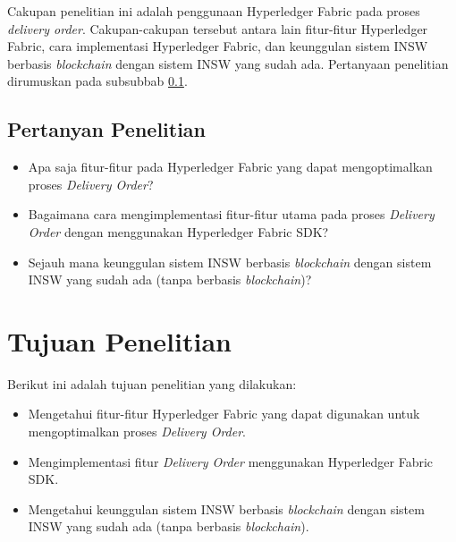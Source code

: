 Cakupan penelitian ini adalah penggunaan Hyperledger Fabric pada proses \textit{delivery order}. Cakupan-cakupan tersebut antara lain fitur-fitur Hyperledger Fabric, cara implementasi Hyperledger Fabric, dan keunggulan sistem INSW berbasis \textit{blockchain} dengan sistem INSW yang sudah ada. Pertanyaan penelitian dirumuskan pada subsubbab \ref{sec:pertanyaanPenelitian}.

\subsection{Pertanyan Penelitian}
\label{sec:pertanyaanPenelitian}

\begin{itemize}
	\item Apa saja fitur-fitur pada Hyperledger Fabric yang dapat mengoptimalkan proses \textit{Delivery Order}?
	\item Bagaimana cara mengimplementasi fitur-fitur utama pada proses \textit{Delivery Order} dengan menggunakan Hyperledger Fabric SDK?
	\item Sejauh mana keunggulan sistem INSW berbasis \textit{blockchain} dengan sistem INSW yang sudah ada (tanpa berbasis \textit{blockchain})?
\end{itemize}

\section{Tujuan Penelitian}
\label{sec:tujuan}
Berikut ini adalah tujuan penelitian yang dilakukan:
\begin{itemize}
	\item Mengetahui fitur-fitur Hyperledger Fabric yang dapat digunakan untuk mengoptimalkan proses \textit{Delivery Order}.
	\item Mengimplementasi fitur \textit{Delivery Order} menggunakan Hyperledger Fabric SDK.
	\item Mengetahui keunggulan sistem INSW berbasis \textit{blockchain} dengan sistem INSW yang sudah ada (tanpa berbasis \textit{blockchain}).
\end{itemize}


